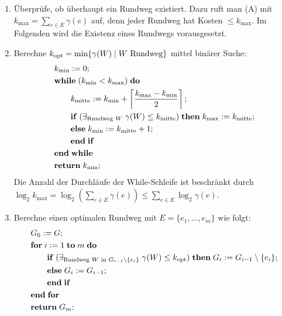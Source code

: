 \begin{Beweis}
    \begin{enumerate}
        \item
        Überprüfe, ob überhaupt ein Rundweg existiert.
        Dazu ruft man (A) mit $k_{\max} = \sum_{e \in E} \gamma(e)$ auf,
        denn jeder Rundweg hat Kosten $\le k_{\max}$.
        Im Folgenden wird die Existenz eines Rundwegs vorausgesetzt.

        \item
        Berechne $k_{\text{opt}} = \min\{\gamma(W) \;|\; W \text{ Rundweg}\}$ mittel binärer Suche:
        \begin{align*}&
            k_{\min} := 0;\\&
            \mathbf{while}\; (k_{\min} < k_{\max})\; \mathbf{do}\;\\&
            \qquad k_\text{mitte} := k_{\min} +
            \left\lceil \frac{k_{\max} - k_{\min}}{2} \right\rceil;\\&
            \qquad \mathbf{if}\; (\exists_{\text{Rundweg } W}\; \gamma(W) \le k_\text{mitte})\; \mathbf{then}\;
            k_{\max} := k_\text{mitte};\\&
            \qquad \mathbf{else}\; k_{\min} := k_\text{mitte} + 1;\\&
            \qquad \mathbf{end}\;\mathbf{if}\;\\&
            \mathbf{end}\;\mathbf{while}\;\\&
            \mathbf{return}\; k_{\min};
        \end{align*}
        Die Anzahl der Durchläufe der While-Schleife ist beschränkt durch\\
        $\log_2 k_{\max} = \log_2 (\sum_{e \in E} \gamma(e)) \le \sum_{e \in E} \log_2 \gamma(e)$.

        \item
        Berechne einen optimalen Rundweg mit $E = \{e_1, \dotsc, e_m\}$ wie folgt:
        \begin{align*}&
            G_0 := G;\\&
            \mathbf{for}\; i := 1 \;\mathbf{to}\; m \;\mathbf{do}\;\\&
            \qquad \mathbf{if}\; (\exists_{\text{Rundweg } W \text{ in } G_{i-1} \setminus \{e_i\}}\;
            \gamma(W) \le k_{\text{opt}})\; \mathbf{then}\;
            G_i := G_{i-1} \setminus \{e_i\};\\&
            \qquad \mathbf{else}\; G_i := G_{i-1};\\&
            \qquad \mathbf{end}\;\mathbf{if}\;\\&
            \mathbf{end}\;\mathbf{for}\;\\&
            \mathbf{return}\; G_m;
        \end{align*}
    \end{enumerate}
\end{Beweis}

